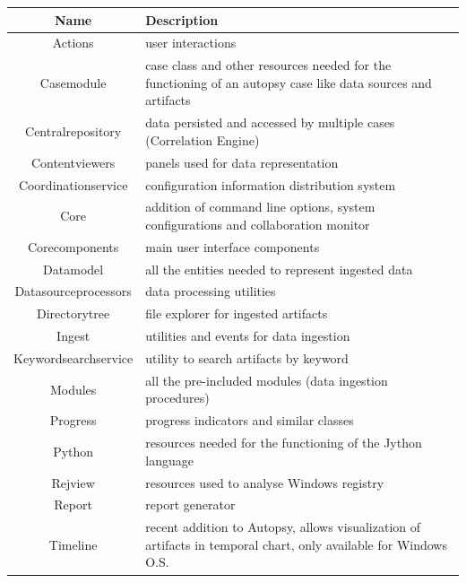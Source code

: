 \begin{table}[h]
  \begin{tabularx}{\textwidth}{@{}|c| *1{>{\centering\arraybackslash}X}@{}|}
    \hline
    \textbf{Name} & \textbf{Description} \\
    \hline\hline
    Actions & user interactions  \\
    \hline
    Casemodule & case class and other resources needed for the functioning of an autopsy case like data sources and artifacts \\
    \hline
    Centralrepository & data persisted and accessed by multiple cases (Correlation Engine) \\
    \hline
    Contentviewers & panels used for data representation  \\
    \hline
    Coordinationservice & configuration information distribution system \\
    \hline
    Core & addition of command line options, system configurations and collaboration monitor  \\
    \hline
    Corecomponents & main user interface components \\
    \hline
    Datamodel & all the entities needed to represent ingested data \\
    \hline
    Datasourceprocessors & data processing utilities  \\
    \hline
    Directorytree & file explorer for ingested artifacts \\
    \hline
    Ingest & utilities and events for data ingestion  \\
    \hline
    Keywordsearchservice & utility to search artifacts by keyword  \\
    \hline
    Modules & all the pre-included modules (data ingestion procedures) \\
    \hline
    Progress & progress indicators and similar classes \\
    \hline
    Python & resources needed for the functioning of the Jython language \\
    \hline
    Rejview & resources used to analyse Windows registry \\
    \hline
    Report & report generator \\
    \hline
    Timeline & recent addition to Autopsy, allows visualization of artifacts in temporal chart, only available for Windows O.S. \\
    \hline
  \end{tabularx}
\end{table}



